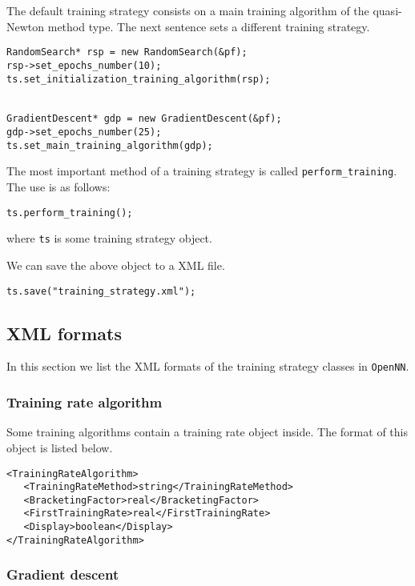 The default training strategy consists on a main training algorithm of the quasi-Newton method type. 
The next sentence sets a different training strategy.

\begin{lstlisting}
RandomSearch* rsp = new RandomSearch(&pf);
rsp->set_epochs_number(10);
ts.set_initialization_training_algorithm(rsp);


GradientDescent* gdp = new GradientDescent(&pf);
gdp->set_epochs_number(25);
ts.set_main_training_algorithm(gdp);
\end{lstlisting}


The most important method of a training strategy is called \lstinline"perform_training". 
The use is as follows:

\begin{lstlisting}
ts.perform_training();
\end{lstlisting}

\noindent where \lstinline"ts" is some training strategy object. 

We can save the above object to a XML file. 

\begin{lstlisting}
ts.save("training_strategy.xml");
\end{lstlisting}


\subsection*{XML formats}

In this section we list the XML formats of the training strategy classes in \texttt{OpenNN}. 

\subsubsection*{Training rate algorithm}

Some training algorithms contain a training rate object inside. 
The format of this object is listed below. 

\begin{lstlisting}
<TrainingRateAlgorithm>
   <TrainingRateMethod>string</TrainingRateMethod>
   <BracketingFactor>real</BracketingFactor>
   <FirstTrainingRate>real</FirstTrainingRate>
   <Display>boolean</Display>
</TrainingRateAlgorithm> 
\end{lstlisting}

\subsubsection*{Gradient descent}
   

